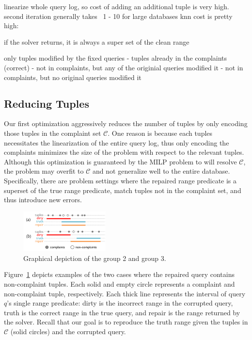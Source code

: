 linearize whole query log, so cost of adding an additional tuple is very high.
second iteration generally takes ~1 - 10%
for large databases knn cost is pretty high: ~

if the solver returns, it is always a super set of the clean range

only tuples modified by the fixed queries
- tuples already in the complaints (correct)
- not in complaints, but any of the originial queries modified it
- not in complaints, but no original queries modified it
\fi



\subsection{Reducing Tuples}
\label{sec:opt:tbsize}


Our first optimization aggressively reduces the number of tuples by only encoding those 
tuples in the complaint set $\mathcal{C}$.  One reason is because each tuples necessitates
the linearization of the entire query log, thus only encoding the complaints minimizes the 
size of the problem with respect to the relevant tuples.
Although this optimization is guaranteed by the MILP problem to 
will resolve $\mathcal{C}$, the problem may overfit to $\mathcal{C}$ 
and not generalize well to the entire database.
Specifically, there are problem settings where the repaired range predicate is a superset of 
the true range predicate, match tuples not in the complaint set, and thus introduce new errors.    

\begin{figure}[t]
    \centering
    \includegraphics[width=0.4\textwidth]{figures/2nditerationgroups}
    \caption{Graphical depiction of the group 2 and group 3. }
    \label{fig:groups}
\end{figure}

Figure~\ref{fig:groups} depicts examples of the two cases where the repaired query contains non-complaint tuples.
Each solid and empty circle represents a complaint and non-complaint tuple, respectively.
Each thick line represents the interval of query $q$'s single range predicate: 
dirty is the incorrect range in the corrupted query,
truth is the correct range in the true query, 
and repair is the range returned by the solver.
Recall that our goal is to reproduce the truth range given the tuples in $\mathcal{C}$ (solid circles)
and the corrupted query.

